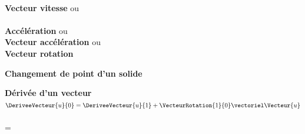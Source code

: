 \documentclass[b,e,cours]{D:/Dropbox/enseignement/CPGE/raphaelpoiree/paquets/classe_kara}
\begin{document}
\begin{frame}
\\

\textbf{Vecteur vitesse}\newline
{} ou \\

\\


\textbf{Accélération}\newline
{} ou 
\\

\textbf{Vecteur accélération}\newline
{} ou 
\\


\textbf{Vecteur rotation}\newline
{}

\textbf{Changement de point d'un solide}\newline
{}\\

\textbf{Dérivée d'un vecteur}\newline
{}\\

$\DeriveeVecteur{u}{0}=\DeriveeVecteur{u}{1}+\VecteurRotation{1}{0}\vectoriel \Vecteur{u}$\\

\\


=

\end{frame}
%
%
%

%
%
\end{document}
